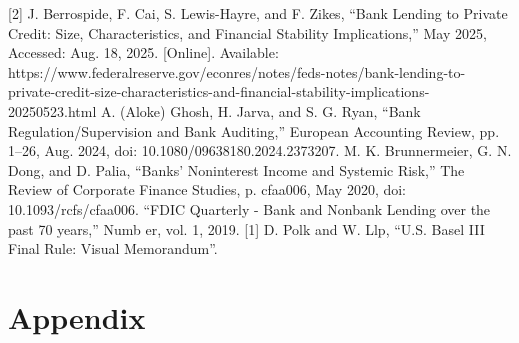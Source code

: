 \documentclass[conference]{IEEEtran}
\begin{document}
\begin{thebibliography}{00}
[2] J. Berrospide, F. Cai, S. Lewis-Hayre, and F. Zikes, “Bank Lending to Private Credit: Size, Characteristics, and Financial Stability Implications,” May 2025, Accessed: Aug. 18, 2025. [Online]. Available: https://www.federalreserve.gov/econres/notes/feds-notes/bank-lending-to-private-credit-size-characteristics-and-financial-stability-implications-20250523.html
 A. (Aloke) Ghosh, H. Jarva, and S. G. Ryan, “Bank Regulation/Supervision and Bank Auditing,” European Accounting Review, pp. 1–26, Aug. 2024, doi: 10.1080/09638180.2024.2373207.
 M. K. Brunnermeier, G. N. Dong, and D. Palia, “Banks’ Noninterest Income and Systemic Risk,” The Review of Corporate Finance Studies, p. cfaa006, May 2020, doi: 10.1093/rcfs/cfaa006.
 “FDIC Quarterly - Bank and Nonbank Lending over the past 70 years,” Numb er, vol. 1, 2019.
[1] D. Polk and W. Llp, “U.S. Basel III Final Rule: Visual Memorandum”.

\end{thebibliography}

\section{Appendix}
\end{document}
